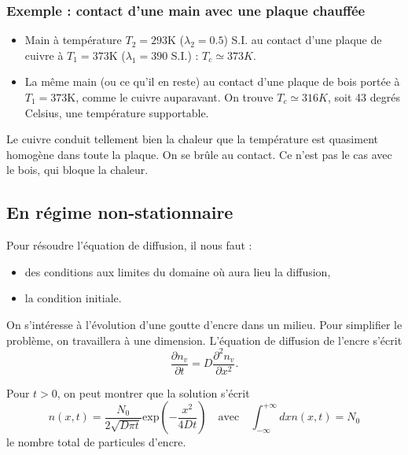 \documentclass[11pt,a4paper]{report}
\begin{document}
\subsubsection*{Exemple : contact d'une main avec une plaque chauffée}
\begin{itemize}
\item Main à température $T_2 = 293$K ($\lambda_2 = 0.5$) S.I. au contact d'une plaque de cuivre à $T_1 = 373$K ($\lambda_1 = 390$ S.I.) : $T_c \simeq 373 K$.\\

\item La même main (ou ce qu'il en reste) au contact d'une plaque de bois portée à $T_1 = 373$K, comme le cuivre auparavant. On trouve $T_c \simeq 316 K$, soit 43 degrés Celsius, une température supportable.
\end{itemize}

Le cuivre conduit tellement bien la chaleur que la température est quasiment homogène dans toute la plaque. On se brûle au contact. Ce n'est pas le cas avec le bois, qui bloque la chaleur. 

\subsection{En régime non-stationnaire}

Pour résoudre l'équation de diffusion, il nous faut :
\begin{itemize}
	\item des conditions aux limites du domaine où aura lieu la diffusion,
	\item la condition initiale.\\
\end{itemize}

On s'intéresse à l'évolution d'une goutte d'encre dans un milieu. Pour simplifier le problème, on travaillera à une dimension. L'équation de diffusion de l'encre s'écrit
\begin{equation}
	\frac{\partial n_v}{\partial t} = D \frac{\partial^2 n_v}{\partial x^2}.
\end{equation}

Pour $t > 0$, on peut montrer que la solution s'écrit 
\begin{equation}
	n(x,t) = \frac{N_0}{2\sqrt{D\pi t}}\text{exp}\left(-\frac{x^2}{4Dt} \right) 
	\quad\text{avec}\quad \int_{-\infty}^{+\infty} dx n(x,t) = N_0
\end{equation}
le nombre total de particules d'encre.\\
\end{document}
